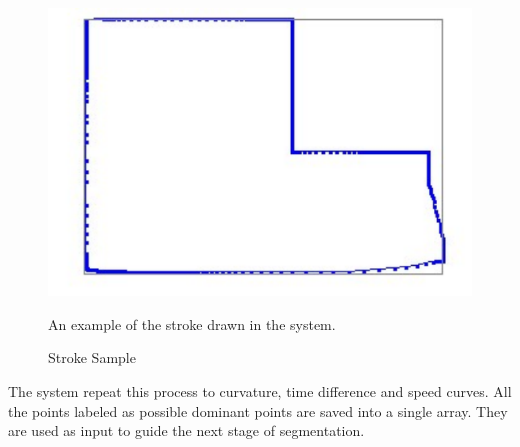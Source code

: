 \documentclass[a4paper,10pt]{IEEEconf}
\begin{document}
\begin{figure}[]
	\centering
		\includegraphics[scale=0.3]{images/orignalStroke.pdf}
	\caption{Stroke Sample} An example of the stroke drawn in the system.
	\label{fig:orignalStroke}
\end{figure}
The system repeat this process to curvature, time difference and speed curves. All the points labeled as possible dominant points are saved into a single array. They are used as input to guide the next stage of segmentation. 
\end{document}
